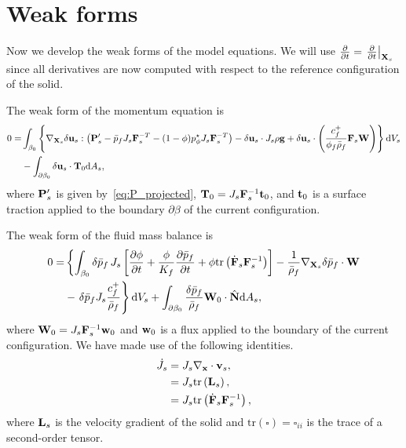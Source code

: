 \documentclass[11pt]{article}
\begin{document}
\section{Weak forms}
Now we develop the weak forms of the model equations.  We will use $\frac{\partial}{\partial t} = \left.\frac{\partial}{\partial t}\right\vert_{\mathbf{X}_s}$ since all derivatives are now computed with respect to the reference configuration of the solid.

The weak form of the momentum equation is
\begin{align}
  0 =& \int_{\mathcal{\beta}_0} \left\lbrace \nabla_{\mathbf{X}_s} \delta \mathbf{u}_s : \left( \mathbf{P}_s' - \bar{p}_f J_s \mathbf{F}_s^{-T} - (1-\phi)p^\star_\phi J_s \mathbf{F}_s^{-T} \right)  -  \delta \mathbf{u}_s \cdot J_s \rho \mathbf{g}  +  \delta \mathbf{u}_s \cdot \left( \frac{c_f^+}{\phi_f \bar{\rho}_f} \mathbf{F}_s \mathbf{W} \right) \right\rbrace {\rm d}{V_{s}}  \notag \\
  &- \int_{\partial \beta_0} \delta \mathbf{u}_s \cdot \mathbf{T}_0 {\rm d}A_{s}, \label{eq:weak_mom}
\end{align}
%
where $\mathbf{P}'_s$ is given by~\eqref{eq:P_projected}, $\mathbf{T}_0 = J_s \mathbf{F}_s^{-1} \mathbf{t}_0$, and $\mathbf{t}_0$ is a surface traction applied to the boundary $\partial\beta$ of the current configuration.

The weak form of the fluid mass balance is
%
\begin{align}
  0 =& \left\lbrace \int_{\beta_0} \delta \bar{p}_f \, J_s \left[\frac{\partial \phi}{\partial t} + \frac{\phi}{K_f} \frac{\partial \bar{p}_f}{\partial t} + \phi \mbox{tr} \left( \dot{\mathbf{F}}_s  \mathbf{F}_s^{-1} \right) \right] - \frac{1}{\bar{\rho}_f} \nabla_{\mathbf{X}_s} \delta \bar{p}_f \cdot \mathbf{W} \right. \notag \\
    &- \left. \delta \bar{p}_f J_s  \frac{c_f^+}{\bar{\rho}_f}   \right\rbrace {\rm d}V_s + \int_{\partial \beta_0} \frac{\delta \bar{p}_f}{\bar{\rho}_f} {\mathbf{W}_0 \cdot \hat{\mathbf{N}}} {\rm d}A_s,
\end{align}
%
where $\mathbf{W}_0 = J_s \mathbf{F}_s^{-1} \mathbf{w}_0$ and $\mathbf{w}_0$ is a flux applied to the boundary of the current configuration. We have made use of the following identities.
%
\begin{align}
  \dot{J}_s &= J_s \nabla_{\mathbf{x}} \cdot \mathbf{v}_s, \notag \\
            &= J_s \mbox{tr}\left(\mathbf{L}_s\right), \notag \\
            &= J_s \mbox{tr}\left(\dot{\mathbf{F}}_s \mathbf{F}_s^{-1}\right), \notag
\end{align}
%
where $\mathbf{L}_s$ is the velocity gradient of the solid and $\mbox{tr}\left(\square\right) = \square_{ii}$ is the trace of a second-order tensor.
\end{document}
